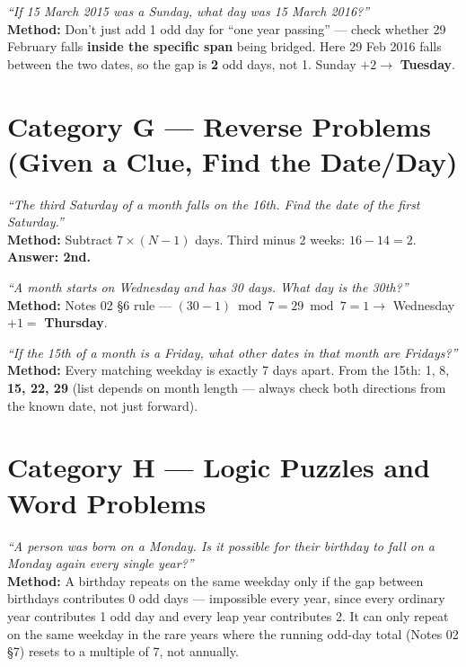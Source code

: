 \documentclass[11pt]{article}
\begin{document}
\begin{examplebox}
\emph{``If 15 March 2015 was a Sunday, what day was 15 March 2016?''} \\
\textbf{Method:} Don't just add 1 odd day for ``one year passing'' --- check whether 29 February
falls \textbf{inside the specific span} being bridged. Here 29 Feb 2016 falls between the two dates,
so the gap is \textbf{2} odd days, not 1. Sunday $+2 \to$ \textbf{Tuesday}.
\end{examplebox}

\section{Category G --- Reverse Problems (Given a Clue, Find the Date/Day)}

\begin{examplebox}
\emph{``The third Saturday of a month falls on the 16th. Find the date of the first Saturday.''} \\
\textbf{Method:} Subtract $7\times(N-1)$ days. Third minus 2 weeks: $16-14=2$. \textbf{Answer: 2nd.}
\end{examplebox}

\begin{examplebox}
\emph{``A month starts on Wednesday and has 30 days. What day is the 30th?''} \\
\textbf{Method:} Notes 02 \S6 rule --- $(30-1) \bmod 7 = 29 \bmod 7 = 1 \to$ Wednesday $+1 = $
\textbf{Thursday}.
\end{examplebox}

\begin{examplebox}
\emph{``If the 15th of a month is a Friday, what other dates in that month are Fridays?''} \\
\textbf{Method:} Every matching weekday is exactly 7 days apart. From the 15th: 1, 8,
\textbf{15, 22, 29} (list depends on month length --- always check both directions from the known
date, not just forward).
\end{examplebox}

\section{Category H --- Logic Puzzles and Word Problems}

\begin{examplebox}
\emph{``A person was born on a Monday. Is it possible for their birthday to fall on a Monday again
every single year?''} \\
\textbf{Method:} A birthday repeats on the same weekday only if the gap between birthdays
contributes 0 odd days --- impossible every year, since every ordinary year contributes 1 odd day
and every leap year contributes 2. It can only repeat on the same weekday in the rare years where
the running odd-day total (Notes 02 \S7) resets to a multiple of 7, not annually.
\end{examplebox}
\end{document}
